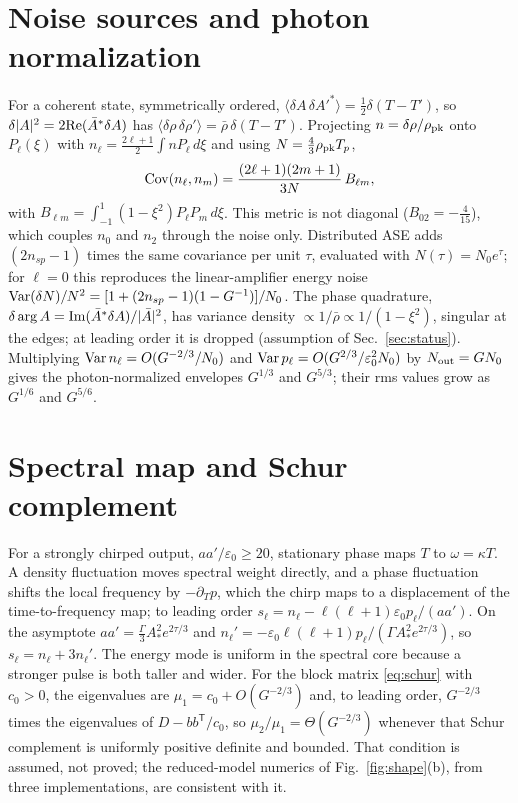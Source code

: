 \documentclass[aps,pra,twocolumn,superscriptaddress,nofootinbib,floatfix]{revtex4-2}
\newcommand{\nsp}{n_{sp}}
\newcommand{\Nout}{N_{\rm out}}
\newcommand{\eps}{\varepsilon_0}
\begin{document}
\section{Noise sources and photon normalization}\label{app:noise}

For a coherent state, symmetrically ordered, $\langle\delta A\,\delta A'^*\rangle=\frac12\delta(T-T')$, so
$\delta|A|^2=2{\rm Re}(\bar A^*\delta A)$ has $\langle\delta\rho\,\delta\rho'\rangle=\bar\rho\,\delta(T-T')$. Projecting
$n=\delta\rho/\rho_{\rm pk}$ onto $P_\ell(\xi)$ with $n_\ell=\frac{2\ell+1}2\int nP_\ell\,d\xi$ and using
$N=\frac43\rho_{\rm pk}T_p$,
\begin{equation}
{\rm Cov}(n_\ell,n_m)=\frac{(2\ell+1)(2m+1)}{3N}\,B_{\ell m},
\end{equation}
with $B_{\ell m}=\int_{-1}^1(1-\xi^2)P_\ell P_m\,d\xi$.
This metric is not diagonal ($B_{02}=-\frac4{15}$), which couples $n_0$ and $n_2$ through the noise only. Distributed ASE
adds $(2\nsp-1)$ times the same covariance per unit $\tau$, evaluated with $N(\tau)=N_0e^\tau$; for $\ell=0$ this reproduces
the linear-amplifier energy noise ${\rm Var}(\delta N)/N^2=[1+(2\nsp-1)(1-G^{-1})]/N_0$. The phase quadrature,
$\delta\arg A={\rm Im}(\bar A^*\delta A)/|\bar A|^2$, has variance density $\propto1/\bar\rho\propto1/(1-\xi^2)$, singular at the
edges; at leading order it is dropped (assumption of Sec.~\ref{sec:status}). Multiplying ${\rm Var}\,n_\ell=O(G^{-2/3}/N_0)$
and ${\rm Var}\,p_\ell=O(G^{2/3}/\eps^2N_0)$ by $\Nout=GN_0$ gives the photon-normalized envelopes $G^{1/3}$ and $G^{5/3}$;
their rms values grow as $G^{1/6}$ and $G^{5/6}$.

\section{Spectral map and Schur complement}\label{app:spec}

For a strongly chirped output, $aa'/\eps\ge20$, stationary phase maps $T$ to $\omega=\kappa T$. A density fluctuation moves
spectral weight directly, and a phase fluctuation shifts the local frequency by $-\partial_T p$, which the chirp maps to a
displacement of the time-to-frequency map; to leading order $s_\ell=n_\ell-\ell(\ell+1)\eps p_\ell/(aa')$. On the asymptote
$aa'=\frac\Gamma3A_*^2e^{2\tau/3}$ and $n_\ell'=-\eps\ell(\ell+1)p_\ell/(\Gamma A_*^2e^{2\tau/3})$, so $s_\ell=n_\ell+3n_\ell'$.
The energy mode is uniform in the spectral core because a stronger pulse is both taller and wider. For the block matrix
\eqref{eq:schur} with $c_0>0$, the eigenvalues are $\mu_1=c_0+O(G^{-2/3})$ and, to leading order, $G^{-2/3}$ times the
eigenvalues of $D-bb^{\mathsf T}/c_0$, so $\mu_2/\mu_1=\Theta(G^{-2/3})$ whenever that Schur complement is uniformly
positive definite and bounded. That condition is assumed, not proved; the reduced-model numerics of Fig.~\ref{fig:shape}(b),
from three implementations, are consistent with it.
\end{document}
